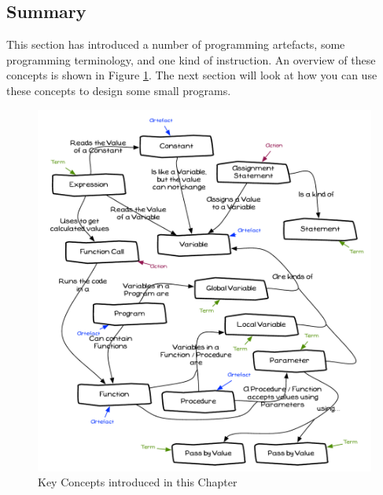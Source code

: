 \clearpage
\subsection{Summary} %
\label{sub:data_concepts_summary}

This section has introduced a number of programming artefacts, some programming terminology, and one kind of instruction. An overview of these concepts is shown in Figure \ref{fig:data-summary}. The next section will look at how you can use these concepts to design some small programs.

\begin{figure}[h]
   \centering
   \includegraphics[width=\textwidth]{./topics/storing-using-data/diagrams/Summary} 
   \caption[Chapter Concepts]{Key Concepts introduced in this Chapter}
   \label{fig:data-summary}
\end{figure}


